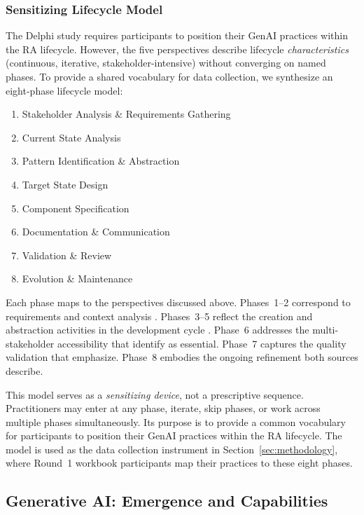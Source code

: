 \subsubsection{Sensitizing Lifecycle Model}

The Delphi study requires participants to position their GenAI practices within
the RA lifecycle. However, the five perspectives describe lifecycle
\textit{characteristics} (continuous, iterative, stakeholder-intensive) without
converging on named phases. To provide a shared vocabulary for data collection,
we synthesize an eight-phase lifecycle model:

\begin{enumerate}
    \item Stakeholder Analysis \& Requirements Gathering
    \item Current State Analysis
    \item Pattern Identification \& Abstraction
    \item Target State Design
    \item Component Specification
    \item Documentation \& Communication
    \item Validation \& Review
    \item Evolution \& Maintenance
\end{enumerate}

Each phase maps to the perspectives discussed above.
Phases~1--2 correspond to requirements and context analysis
\parencite{angelov_framework_2012}. Phases~3--5 reflect the creation and
abstraction activities in the development cycle
\parencite{cloutier_concept_2010, angelov_framework_2012}. Phase~6 addresses
the multi-stakeholder accessibility that
\textcite{cloutier_concept_2010} identify as essential. Phase~7 captures the
quality validation that \textcite{angelov_framework_2012} emphasize. Phase~8
embodies the ongoing refinement both sources describe.

This model serves as a \textit{sensitizing device}, not a prescriptive
sequence. Practitioners may enter at any phase, iterate, skip phases, or work
across multiple phases simultaneously. Its purpose is to provide a common
vocabulary for participants to position their GenAI practices within the RA
lifecycle. The model is used as the data collection instrument in
Section~\ref{sec:methodology}, where Round~1 workbook participants map their
practices to these eight phases.

\subsection{Generative AI: Emergence and Capabilities}\label{subsec:generative-ai}

